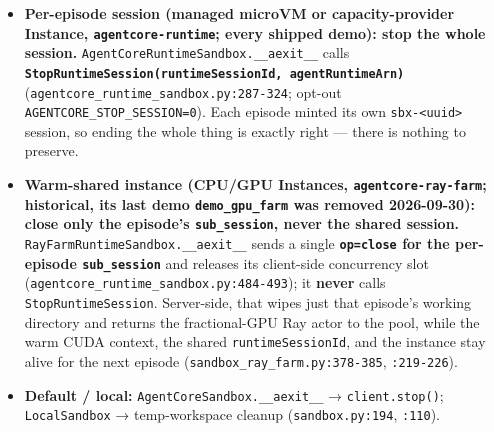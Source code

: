 \documentclass[
  paper=a4,
  ,captions=tableheading
]{scrartcl}
\providecommand{\tightlist}{%
  \setlength{\itemsep}{0pt}\setlength{\parskip}{0pt}}
\begin{document}
\begin{itemize}
\tightlist
\item
  \textbf{Per-episode session (managed microVM or capacity-provider
  Instance, \texttt{agentcore-runtime}; every shipped demo): stop the
  whole session.} \texttt{AgentCoreRuntimeSandbox.\_\_aexit\_\_} calls
  \textbf{\texttt{StopRuntimeSession(runtimeSessionId,\ agentRuntimeArn)}}
  (\texttt{agentcore\_runtime\_sandbox.py:287-324}; opt-out
  \texttt{AGENTCORE\_STOP\_SESSION=0}). Each episode minted its own
  \texttt{sbx-\textless{}uuid\textgreater{}} session, so ending the
  whole thing is exactly right --- there is nothing to preserve.
\item
  \textbf{Warm-shared instance (CPU/GPU Instances,
  \texttt{agentcore-ray-farm}; historical, its last demo
  \texttt{demo\_gpu\_farm} was removed 2026-09-30): close only the
  episode's \texttt{sub\_session}, never the shared session.}
  \texttt{RayFarmRuntimeSandbox.\_\_aexit\_\_} sends a single
  \textbf{\texttt{op=close} for the per-episode \texttt{sub\_session}}
  and releases its client-side concurrency slot
  (\texttt{agentcore\_runtime\_sandbox.py:484-493}); it \textbf{never}
  calls \texttt{StopRuntimeSession}. Server-side, that wipes just that
  episode's working directory and returns the fractional-GPU Ray actor
  to the pool, while the warm CUDA context, the shared
  \texttt{runtimeSessionId}, and the instance stay alive for the next
  episode (\texttt{sandbox\_ray\_farm.py:378-385}, \texttt{:219-226}).
\item
  \textbf{Default / local:} \texttt{AgentCoreSandbox.\_\_aexit\_\_} →
  \texttt{client.stop()}; \texttt{LocalSandbox} → temp-workspace cleanup
  (\texttt{sandbox.py:194}, \texttt{:110}).
\end{itemize}
\end{document}
